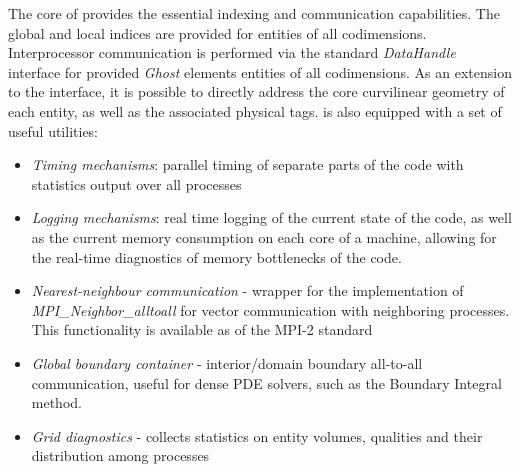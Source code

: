 \noindent
The core of \curvgrid{} provides the essential indexing and communication capabilities. The global and local indices are provided for entities of all codimensions. Interprocessor communication is performed via the \dune{} standard \textit{DataHandle} interface for provided \textit{Ghost} elements entities of all codimensions. As an extension to the \dunegrid{} interface, it is possible to directly address the core curvilinear geometry of each entity, as well as the associated physical tags. \curvgrid{} is also equipped with a set of useful utilities:
\begin{itemize}
    \item \textit{Timing mechanisms}: parallel timing of separate parts of the code with statistics output over all processes
    \item \textit{Logging mechanisms}: real time logging of the current state of the code, as well as the current memory consumption on each core of a machine, allowing for the real-time diagnostics of memory bottlenecks of the code.
    \item \textit{Nearest-neighbour communication} - wrapper for the implementation of \textit{MPI\_Neighbor\_alltoall} for vector communication with neighboring processes. This functionality is available as of the MPI-2 standard \cite{MPI-3.1}
    \item \textit{Global boundary container} - interior/domain boundary all-to-all communication, useful for dense PDE solvers, such as the Boundary Integral method. \cite{kern+2009}
    \item \textit{Grid diagnostics} - collects statistics on entity volumes, qualities and their distribution among processes
\end{itemize}



% 


